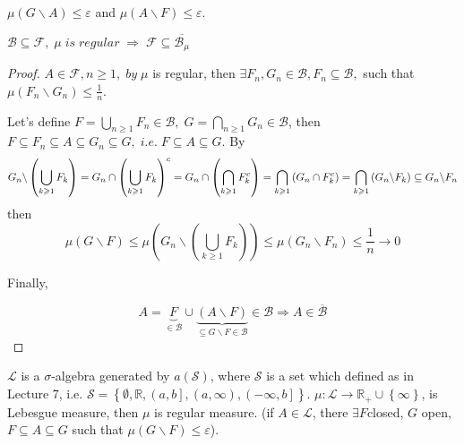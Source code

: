 \begin{remark}
	$ \mu \left( {G\backslash A} \right) \leqslant \varepsilon $   and  $ \mu \left( {A\backslash F} \right) \leqslant \varepsilon $. 
	\label{rmk9.3}
\end{remark}

\begin{remark}
	$\mathcal{B} \subseteq \mathcal{F},\;\mu \;is\;regular\; \Rightarrow \;\mathcal{F} \subseteq \overline {{\mathcal{B}_\mu }} $
	\label{rmk9.4}
\end{remark}

\begin{proof}
	$ 	A \in \mathcal{F}, n \ge 1, \; by \;  \mu $ is regular, then $ \exists F_{n}, G_{n} \in \mathcal{B}, F_{n} \subseteq \mathcal{B}, $ such that $\mu \left( {{F_n}\backslash {G_n}} \right) \leqslant \frac{1}{n}$. 
	
	Let's define $F = \bigcup\limits_{n \geqslant 1} {{F_n}}  \in \mathcal{B},\;G = \bigcap\limits_{n \geqslant 1} {{G_n}}  \in \mathcal{B}$, then $F \subseteq {F_n} \subseteq A \subseteq {G_n} \subseteq G,\;i.e.\;F \subseteq A \subseteq G$.
	By
	\begin{equation}
	\small 
	{G_n}\backslash \left( {\bigcup\limits_{k \geqslant 1} {{F_k}} } \right) = {G_n} \cap {\left( {\bigcup\limits_{k \geqslant 1} {{F_k}} } \right)^c} = {G_n} \cap \left( {\bigcap\limits_{k \geqslant 1} {F_k^c} } \right) = \bigcap\limits_{k \geqslant 1} {\left( {{G_n} \cap F_k^c} \right)}  = \bigcap\limits_{k \geqslant 1} {\left( {{G_n}\backslash {F_k}} \right)}  \subseteq {G_n}\backslash {F_n}
	\label{eq9.10}
	\end{equation}
	then 
	\begin{equation}
	\mu \left( {G\backslash F} \right) \leqslant \mu \left( {{G_n}\backslash \left( {\bigcup\limits_{k \geqslant 1} {{F_k}} } \right)} \right) \leqslant \mu \left( {{G_n}\backslash {F_n}} \right) \leqslant \frac{1}{n} \to 0
	\label{eq9.11}
	\end{equation}
	
	Finally, 
	
	\begin{equation}
	A = \underbrace F_{ \in \mathcal{B}} \cup \underbrace {\left( {A\backslash F} \right)}_{ \subseteq G\backslash F \in \mathcal{B}} \in \mathcal{B} \Rightarrow A \in \overline {\mathcal{B}} 
	\label{eq9.12}
	\end{equation}
\end{proof}

\begin{theorem}
	$\mathcal{L}$ is a $\sigma$-algebra generated by $ a(\mathcal{S}) $, where $ \mathcal{S} $ is a set which defined as in Lecture 7, i.e. $ \mathcal{S} = \left\{ {\emptyset ,\mathbb{R},\left( {a,b} \right],\left( {a,\infty } \right),\left( { - \infty ,b} \right]} \right\}.$ $\mu :\mathcal{L} \to {\mathbb{R}_ + } \cup \left\{ \infty  \right\}$, is Lebesgue measure, then $ \mu  $ is regular measure. (if $ A \in \mathcal{L}$, there $\exists F$closed, $ G $ open, $F \subseteq A \subseteq G$ such that $\mu \left( {G\backslash F} \right) \leqslant \varepsilon $).
	\label{thm9.2}
\end{theorem}

